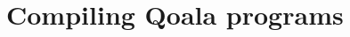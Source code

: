 \chapter
 [Compiling Qoala programs]
 {Compiling Qoala programs}
\label{chp:compiler}

\lipsum[120-150]